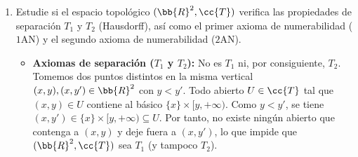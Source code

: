 \documentclass[12pt]{article}
\begin{document}
\begin{ejercicio}
\begin{enumerate}[label=\alph*)]
\begin{enumerate}
        \item $H = [0, +\infty) \times \bb{R}$.\\
        $H^{\circ} = H$.\\
        Para cada $(x, y) \in H$ se tiene $x \geq 0$, luego el básico $B = \{x\} \times [y, +\infty)$ satisface $(x, y) \in B \subseteq H$. Así, $H$ es abierto y $H^{\circ} = H$.\\

        $\overline{H} = H$.\\
        Su complementario es $\bb{R}^2 \setminus H = (-\infty, 0) \times \bb{R}$. Para todo $(x, y) \in \bb{R}^2 \setminus H$ se cumple $x < 0$, luego $B = \{x\} \times [y, +\infty) \subseteq (-\infty, 0) \times \bb{R}$. Por tanto, $\bb{R}^2 \setminus H$ es abierto, $H$ es cerrado y $\overline{H} = H$.\\

        $\partial H = \overline{H} \setminus H^{\circ} = \varnothing$.
        \begin{center}
        \end{center}
    \end{enumerate}

    

    \item Estudie si el espacio topológico $(\bb{R}^2, \cc{T})$ verifica las propiedades de separación $T_1$ y $T_2$ (Hausdorff), así como el primer axioma de numerabilidad ($1\mathrm{AN}$) y el segundo axioma de numerabilidad ($2\mathrm{AN}$).
    \begin{itemize}
        \item \textbf{Axiomas de separación ($T_1$ y $T_2$):} No es $T_1$ ni, por consiguiente, $T_2$.\\
        Tomemos dos puntos distintos en la misma vertical $(x, y), (x, y') \in \bb{R}^2$ con $y < y'$. Todo abierto $U \in \cc{T}$ tal que $(x, y) \in U$ contiene al básico $\{x\} \times [y, +\infty)$. Como $y < y'$, se tiene $(x, y') \in \{x\} \times [y, +\infty) \subseteq U$. Por tanto, no existe ningún abierto que contenga a $(x, y)$ y deje fuera a $(x, y')$, lo que impide que $(\bb{R}^2, \cc{T})$ sea $T_1$ (y tampoco $T_2$).


\end{itemize}
\end{enumerate}
\end{ejercicio}
\end{document}
